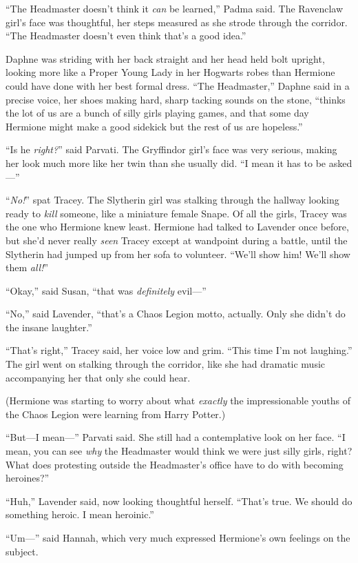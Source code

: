 “The Headmaster doesn’t think it \emph{can} be learned,” Padma said. The Ravenclaw girl’s face was thoughtful, her steps measured as she strode through the corridor. “The Headmaster doesn’t even think that’s a good idea.”

Daphne was striding with her back straight and her head held bolt upright, looking more like a Proper Young Lady in her Hogwarts robes than Hermione could have done with her best formal dress. “The Headmaster,” Daphne said in a precise voice, her shoes making hard, sharp tacking sounds on the stone, “thinks the lot of us are a bunch of silly girls playing games, and that some day Hermione might make a good sidekick but the rest of us are hopeless.”

“Is he \emph{right?}” said Parvati. The Gryffindor girl’s face was very serious, making her look much more like her twin than she usually did. “I mean it has to be asked—”

“\emph{No!}” spat Tracey. The Slytherin girl was stalking through the hallway looking ready to \emph{kill} someone, like a miniature female Snape. Of all the girls, Tracey was the one who Hermione knew least. Hermione had talked to Lavender once before, but she’d never really \emph{seen} Tracey except at wandpoint during a battle, until the Slytherin had jumped up from her sofa to volunteer. “We’ll show him! We’ll show them \emph{all!}”

“Okay,” said Susan, “that was \emph{definitely} evil—”

“No,” said Lavender, “that’s a Chaos Legion motto, actually. Only she didn’t do the insane laughter.”

“That’s right,” Tracey said, her voice low and grim. “This time I’m not laughing.” The girl went on stalking through the corridor, like she had dramatic music accompanying her that only she could hear.

(Hermione was starting to worry about what \emph{exactly} the impressionable youths of the Chaos Legion were learning from Harry Potter.)

“But—I mean—” Parvati said. She still had a contemplative look on her face. “I mean, you can see \emph{why} the Headmaster would think we were just silly girls, right? What does protesting outside the Headmaster’s office have to do with becoming heroines?”

“Huh,” Lavender said, now looking thoughtful herself. “That’s true. We should do something heroic. I mean heroinic.”

“Um—” said Hannah, which very much expressed Hermione’s own feelings on the subject.

